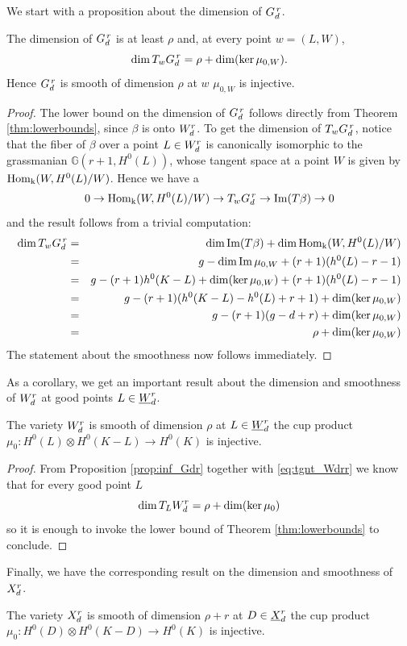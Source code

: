 	We start with a proposition about the dimension of $G_d^{\,r}$. 
	\begin{prop}\label{prop:inf_Gdr}
		The dimension of $G_d^{\,r}$ is at least $\rho$ and, at every point $w=(L,W)$,  
		$$ \dim T_w G_d^{\,r} = \rho + \dim( \ker \mu_{0,W} ) .$$ 
		Hence $G_d^{\,r}$ is smooth of dimension $\rho$ at $w$ \ABiff $\mu_{0,W}$ is injective.
	\end{prop}
	\begin{proof}
		The lower bound on the dimension of $G_d^{\,r}$ follows directly from Theorem \ref{thm:lowerbounds}, since $\beta$ is onto $W_d^r$. To get the dimension of $T_w G_d^{\,r}$, notice that the fiber of $\beta$ over a point $L\in W_d^r$ is canonically isomorphic to the grassmanian $\mathbb{G}(r+1,H^0(L))$, whose tangent space at a point $W$ is given by $\operatorname{Hom_k}(W, H^0(L) / W)$. Hence we have a \ses
		$$ 0 \to  \operatorname{Hom_k}(W, H^0(L) / W)  \to  T_w G_d^{\,r}  \to  \operatorname{Im} (T\beta)  \to 0 $$
		and the result follows from a trivial computation:
		\begin{eqnarray*}
			\dim T_w G_d^{\,r}
			&=& \dim\operatorname{Im}(T\beta) + \dim\operatorname{Hom_k}(W, H^0(L) / W) \\
			&=& g-\dim\operatorname{Im}\mu_{0,W} + (r+1)(h^0(L)-r-1) \\
			&=& g-(r+1)h^0(K-L) +\dim(\ker\mu_{0,W}) + (r+1)(h^0(L)-r-1) \\
			&=& g-(r+1)(h^0(K-L) - h^0(L)+r+1) +\dim(\ker\mu_{0,W}) \\
			&=& g-(r+1)(g-d+r) +\dim(\ker\mu_{0,W}) \\
			&=& \rho +\dim(\ker\mu_{0,W})
		\end{eqnarray*}
		The statement about the smoothness now follows immediately.
	\end{proof}
	As a corollary, we get an important result about the dimension and smoothness of $W_d^r$ at good points $L\in \underline{W}_d^{r}$.
	\begin{coro}
		The variety $W_d^r$ is smooth of dimension $\rho$ at $L\in \underline{W}_d^{r}$ \ABiff the cup product $ \mu_{0} : H^0(L)\otimes H^0(K-L) \to H^0(K) $ is injective.
	\end{coro}
	\begin{proof}
		From Proposition \ref{prop:inf_Gdr} together with \eqref{eq:tgnt_Wdrr} we know that for every good point $L$ 
		$$ \dim T_L W_d^r = \rho +\dim(\ker\mu_0) $$
		so it is enough to invoke the lower bound of Theorem \ref{thm:lowerbounds} to conclude.
	\end{proof}
	Finally, we have the corresponding result on the dimension and smoothness of $X_d^r$.
	\begin{prop}
		The variety $X_d^r$ is smooth of dimension $\rho+r$ at $D\in \underline{X}_d^{r}$ \ABiff the cup product $ \mu_{0} : H^0(D)\otimes H^0(K-D) \to H^0(K) $ is injective.
	\end{prop}
